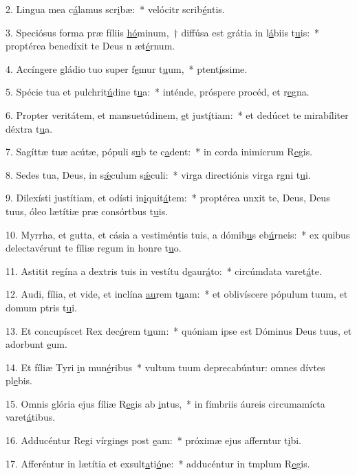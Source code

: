 2. Lingua mea c\uline{á}lamus scr\uline{i}bæ:~* velócitr scrib\uline{é}ntis.\par 
3. Speciósus forma præ fíliis \uline{hó}minum,~† diffúsa est grátia in l\uline{á}biis t\uline{u}is:~* proptérea benedíxit te Deus n æt\uline{é}rnum.\par 
4. Accíngere gládio tuo super f\uline{e}mur t\uline{u}um,~* ptent\uline{í}ssime.\par 
5. Spécie tua et pulchrit\uline{ú}dine t\uline{u}a:~* inténde, próspere procéd, et r\uline{e}gna.\par 
6. Propter veritátem, et mansuetúdinem, \uline{e}t just\uline{í}tiam:~* et dedúcet te mirabíliter déxtra t\uline{u}a.\par 
7. Sagíttæ tuæ acútæ, pópuli s\uline{u}b te c\uline{a}dent:~* in corda inimicrum R\uline{e}gis.\par 
8. Sedes tua, Deus, in s\uline{ǽ}culum s\uline{ǽ}culi:~* virga directiónis virga rgni t\uline{u}i.\par 
9. Dilexísti justítiam, et odísti in\uline{i}quit\uline{á}tem:~* proptérea unxit te, Deus, Deus tuus, óleo lætítiæ præ consórtbus t\uline{u}is.\par 
10. Myrrha, et gutta, et cásia a vestiméntis tuis, a dómib\uline{u}s eb\uline{ú}rneis:~* ex quibus delectavérunt te fíliæ regum in honre t\uline{u}o.\par 
11. Astitit regína a dextris tuis in vestítu d\uline{e}aur\uline{á}to:~* circúmdata varet\uline{á}te.\par 
12. Audi, fília, et vide, et inclína \uline{au}rem t\uline{u}am:~* et oblivíscere pópulum tuum, et domum ptris t\uline{u}i.\par 
13. Et concupíscet Rex dec\uline{ó}rem t\uline{u}um:~* quóniam ipse est Dóminus Deus tuus, et adorbunt \uline{e}um.\par 
14. Et fíliæ Tyri \uline{i}n mun\uline{é}ribus~* vultum tuum deprecabúntur: omnes dívtes pl\uline{e}bis.\par 
15. Omnis glória ejus fíliæ R\uline{e}gis ab \uline{i}ntus,~* in fímbriis áureis circumamícta varet\uline{á}tibus.\par 
16. Adducéntur Regi vírgin\uline{e}s post \uline{e}am:~* próximæ ejus afferntur t\uline{i}bi.\par 
17. Afferéntur in lætítia et exsult\uline{a}ti\uline{ó}ne:~* adducéntur in tmplum R\uline{e}gis.\par 
